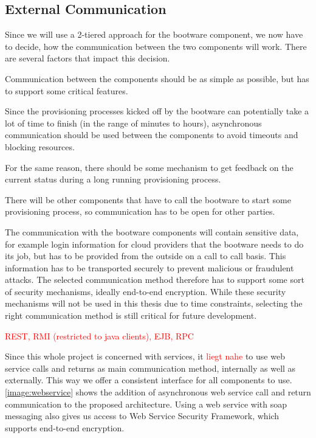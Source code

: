 \subsection{External Communication}
\label{design:communication}

Since we will use a 2-tiered approach for the bootware component, we now have to decide, how the communication between the two components will work.
There are several factors that impact this decision.

Communication between the components should be as simple as possible, but has to support some critical features.

Since the provisioning processes kicked off by the bootware can potentially take a lot of time to finish (in the range of minutes to hours), asynchronous communication should be used between the components to avoid timeouts and blocking resources.

For the same reason, there should be some mechanism to get feedback on the current status during a long running provisioning process.

There will be other components that have to call the bootware to start some provisioning process, so communication has to be open for other parties.

The communication with the bootware components will contain sensitive data, for example login information for cloud providers that the bootware needs to do its job, but has to be provided from the outside on a call to call basis.
This information has to be transported securely to prevent malicious or fraudulent attacks.
The selected communication method therefore has to support some sort of security mechanisms, ideally end-to-end encryption.
While these security mechanisms will not be used in this thesis due to time constraints, selecting the right communication method is still critical for future development.

\textcolor{red}{REST, RMI (restricted to java clients), EJB, RPC}

Since this whole project is concerned with services, it \textcolor{red}{liegt nahe} to use web service calls and returns as main communication method, internally as well as  externally.
This way we offer a consistent interface for all components to use.
\autoref{image:webservice} shows the addition of asynchronous web service call and return communication to the proposed architecture.
Using a web service with soap messaging also gives us access to Web Service Security Framework, which supports end-to-end encryption.

